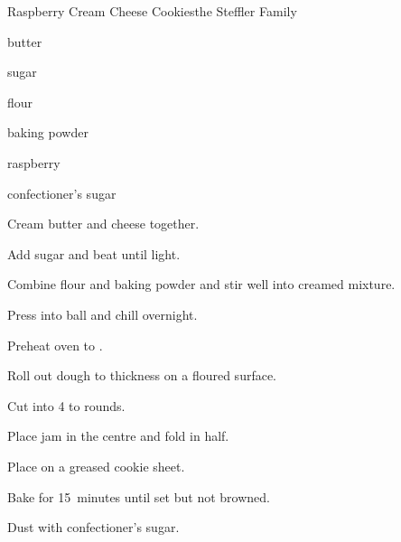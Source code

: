\begin{recipe}{Raspberry Cream Cheese Cookies}{the Steffler Family}{}

\begin{ingredients}
\item {} butter
\item {} 
\item \C{\quarter} sugar
\item {} flour
\item \tp{\half} baking powder
\item \C{\half} raspberry 
\item confectioner's sugar
\end{ingredients}

\begin{directions}
\item Cream butter and cheese together.
\item Add sugar and beat until light.
\item Combine flour and baking powder and stir well into creamed mixture.
\item Press into ball and chill overnight.
\item Preheat oven to .
\item Roll out dough to \cm{\half} thickness on a floured surface.
\item Cut into 4 to  rounds.
\item Place \tp{\half} jam in the centre and fold in half.
\item Place on a greased cookie sheet.
\item Bake for 15~minutes until set but not browned.
\item Dust with confectioner's sugar.
\end{directions}
\end{recipe}

